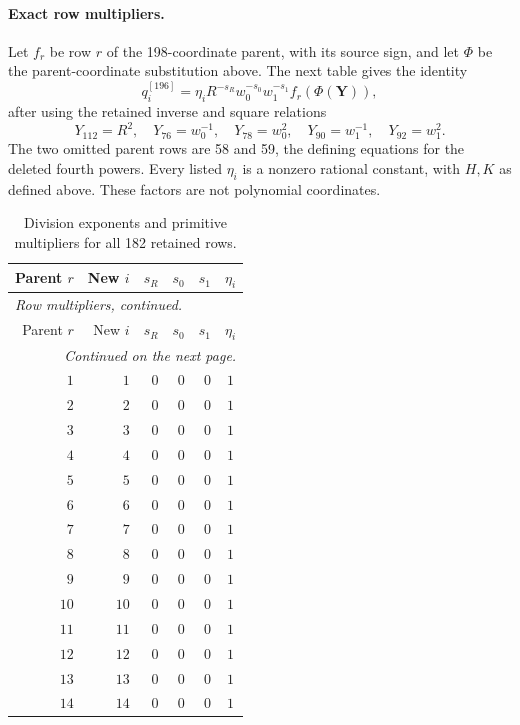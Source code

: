 \paragraph{Exact row multipliers.}
Let $f_r$ be row $r$ of the 198-coordinate parent, with its source sign,
and let $\Phi$ be the parent-coordinate substitution above. The next table gives
the identity
\[
q_i^{[196]}=\eta_i R^{-s_R}w_0^{-s_0}w_1^{-s_1}f_r(\Phi(\mathbf Y)),
\]
after using the retained inverse and square relations
\[
Y_{112}=R^{2},\quad Y_{76}=w_0^{-1},\quad Y_{78}=w_0^{2},
\quad Y_{90}=w_1^{-1},\quad Y_{92}=w_1^{2}.
\]
The two omitted parent rows are 58 and 59, the defining equations for
the deleted fourth powers. Every listed $\eta_i$ is a nonzero rational
constant, with $H,K$ as defined above. These factors are not polynomial coordinates.
{\small
\begin{longtable}{@{}r r r r r c@{}}
\caption{Division exponents and primitive multipliers for all 182 retained rows.}
\label{q196:rowmultipliers}\\
\hline
Parent $r$ & New $i$ & $s_R$ & $s_0$ & $s_1$ & $\eta_i$ \\
\hline
\endfirsthead
\multicolumn{6}{l}{\emph{Row multipliers, continued.}}\\
\hline
Parent $r$ & New $i$ & $s_R$ & $s_0$ & $s_1$ & $\eta_i$ \\
\hline
\endhead
\hline\multicolumn{6}{r}{\emph{Continued on the next page.}}\\
\endfoot
\hline
\endlastfoot
\(1\) & \(1\) & 0 & 0 & 0 & \(1\) \\
\(2\) & \(2\) & 0 & 0 & 0 & \(1\) \\
\(3\) & \(3\) & 0 & 0 & 0 & \(1\) \\
\(4\) & \(4\) & 0 & 0 & 0 & \(1\) \\
\(5\) & \(5\) & 0 & 0 & 0 & \(1\) \\
\(6\) & \(6\) & 0 & 0 & 0 & \(1\) \\
\(7\) & \(7\) & 0 & 0 & 0 & \(1\) \\
\(8\) & \(8\) & 0 & 0 & 0 & \(1\) \\
\(9\) & \(9\) & 0 & 0 & 0 & \(1\) \\
\(10\) & \(10\) & 0 & 0 & 0 & \(1\) \\
\(11\) & \(11\) & 0 & 0 & 0 & \(1\) \\
\(12\) & \(12\) & 0 & 0 & 0 & \(1\) \\
\(13\) & \(13\) & 0 & 0 & 0 & \(1\) \\
\(14\) & \(14\) & 0 & 0 & 0 & \(1\) \\

\end{longtable}}
